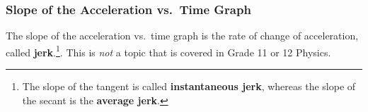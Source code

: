 %
%

\subsubsection{Slope of the Acceleration vs.\ Time Graph}
The slope of the acceleration vs.\ time graph is the rate of change of
acceleration, called \textbf{jerk}.\footnote{The slope of the tangent is
called \textbf{instantaneous jerk}, whereas the slope of the secant is the
\textbf{average jerk}.}. This is \emph{not} a topic that is covered in Grade
11 or 12 Physics.
\begin{figure}[ht]
  \centering
\end{figure}



